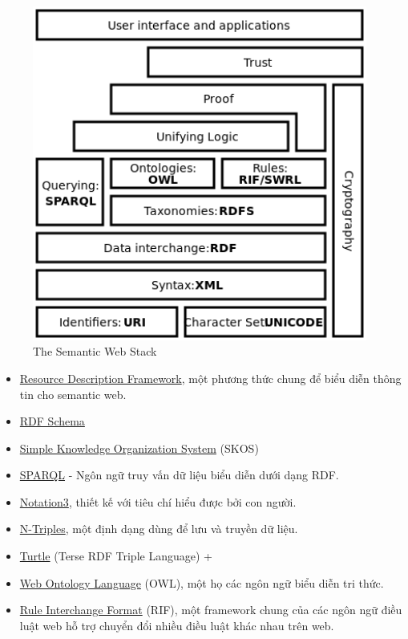 \begin{figure}[h!]
	\centering
	\includegraphics[width=110mm]{Figures/semantic_web_stack.png}
	\caption{The Semantic Web Stack \label{overflow}}
\end{figure}
\begin{itemize}
\item \href{http://en.wikipedia.org/wiki/Resource\_Description\_Framework}{Resource Description Framework}, một phương thức chung để biểu diễn thông tin cho semantic web.
\item \href{http://en.wikipedia.org/wiki/RDF_Schema}{RDF Schema}
\item \href{http://en.wikipedia.org/wiki/Simple_Knowledge_Organization_System}{Simple Knowledge Organization System} (SKOS)
\item \href{http://en.wikipedia.org/wiki/SPARQL}{SPARQL} - Ngôn ngữ truy vấn dữ liệu biểu diễn dưới dạng RDF.
\item \href{http://en.wikipedia.org/wiki/Notation3}{Notation3}, thiết kế với tiêu chí hiểu được bởi con người.
\item \href{http://en.wikipedia.org/wiki/N-Triples}{N-Triples}, một định dạng dùng để lưu và truyền dữ liệu.
\item \href{http://en.wikipedia.org/wiki/Turtle_(syntax)}{Turtle} (Terse RDF Triple Language)
+\item \href{http://en.wikipedia.org/wiki/Web_Ontology_Language}{Web Ontology Language} (OWL), một họ các ngôn ngữ biểu diễn tri thức.

\item \href{}{Rule Interchange Format} (RIF), một framework chung của các ngôn ngữ điều luật web hỗ trợ chuyển đổi nhiều điều luật khác nhau trên web.

\end{itemize}

